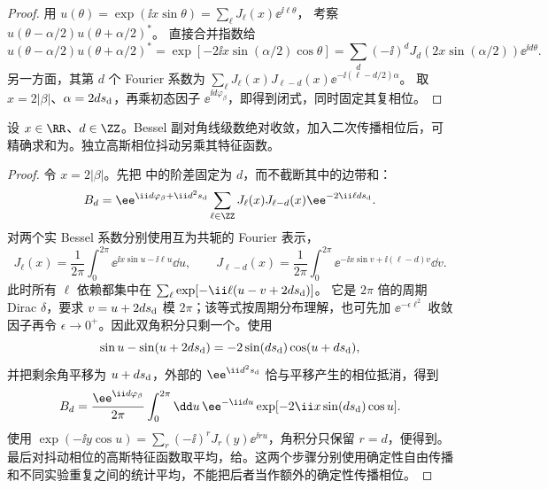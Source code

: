 \begin{proof}
用 $u(\theta)=\exp(\ii x\sin\theta)=\sum_\ell J_\ell(x)\ee^{\ii\ell\theta}$，
考察 $u(\theta-\alpha/2)u(\theta+\alpha/2)^*$。
直接合并指数给
\[
u(\theta-\alpha/2)u(\theta+\alpha/2)^*
=\exp[-2\ii x\sin(\alpha/2)\cos\theta]
=\sum_d(-\ii)^dJ_d(2x\sin(\alpha/2))\ee^{\ii d\theta}.
\]
另一方面，其第 $d$ 个 Fourier 系数为
$\sum_\ell J_\ell(x)J_{\ell-d}(x)\ee^{-\ii(\ell-d/2)\alpha}$。
取 $x=2|\beta|$、$\alpha=2ds_{\rm d}$，再乘初态因子
$\ee^{\ii d\varphi_\beta}$，即得到闭式，同时固定其复相位。
\end{proof}

\begin{proposition}
设 $x\in\RR$、$d\in\ZZ$。Bessel 副对角线级数绝对收敛，加入二次传播相位后，可精确求和为。独立高斯相位抖动另乘其特征函数。
\end{proposition}
\begin{proof}
令 $x=2|\beta|$。先把 中的阶差固定为 $d$，而不截断其中的边带和：
\begin{equation*}
 B_d=\ee^{\ii d\varphi_\beta+\ii d^2s_{\rm d}}
 \sum_{\ell\in\ZZ}J_\ell(x)J_{\ell-d}(x)
 \ee^{-2\ii\ell ds_{\rm d}}.
\end{equation*}
对两个实 Bessel 系数分别使用互为共轭的 Fourier 表示，
\begin{equation*}
 J_\ell(x)=\frac1{2\pi}\int_0^{2\pi}\ee^{\ii x\sin u-\ii\ell u}\dd u,
 \qquad
 J_{\ell-d}(x)=\frac1{2\pi}\int_0^{2\pi}
 \ee^{-\ii x\sin v+\ii(\ell-d)v}\dd v.
\end{equation*}
此时所有 $\ell$ 依赖都集中在
$\sum_\ell\exp[-\ii\ell(u-v+2ds_{\rm d})]$。
它是 $2\pi$ 倍的周期 Dirac $\delta$，要求 $v=u+2ds_{\rm d}$ 模 $2\pi$；该等式按周期分布理解，也可先加 $\ee^{-\epsilon\ell^2}$ 收敛因子再令 $\epsilon\to0^+$。因此双角积分只剩一个。使用
\begin{equation*}
 \sin u-\sin(u+2ds_{\rm d})
 =-2\sin(ds_{\rm d})\cos(u+ds_{\rm d}),
\end{equation*}
并把剩余角平移为 $u+ds_{\rm d}$，外部的 $\ee^{\ii d^2s_{\rm d}}$ 恰与平移产生的相位抵消，得到
\begin{equation*}
 B_d=\frac{\ee^{\ii d\varphi_\beta}}{2\pi}
 \int_0^{2\pi}\dd u\,\ee^{-\ii du}
 \exp[-2\ii x\sin(ds_{\rm d})\cos u].
\end{equation*}
使用 $\exp(-\ii y\cos u)=\sum_r(-\ii)^rJ_r(y)\ee^{\ii ru}$，角积分只保留 $r=d$，便得到。最后对抖动相位的高斯特征函数取平均，给。这两个步骤分别使用确定性自由传播和不同实验重复之间的统计平均，不能把后者当作额外的确定性传播相位。
\end{proof}



